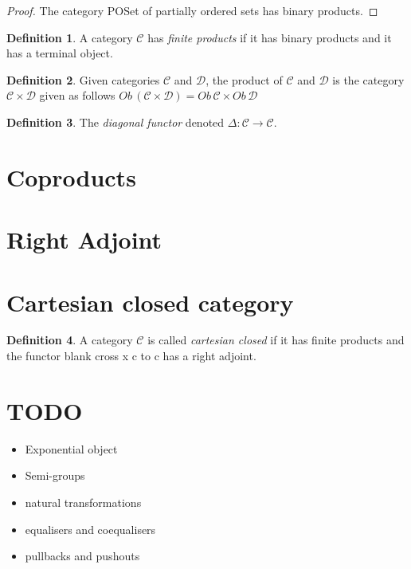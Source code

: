 \documentclass{article}
\theoremstyle{definition}
\newtheorem{definition}{Definition}[section]
\newcommand{\C}{\mathcal{C}}
\newcommand{\D}{\mathcal{D}}
\begin{document}
\begin{proof}
    The category POSet of partially ordered sets has binary products.
\end{proof}

\begin{definition}
    A category $\C$ has \textit{finite products} if
    it has binary products
    and it has a terminal object.
\end{definition}

\begin{definition}
    Given categories $\C$ and $\D$,
    the product of $\C$ and $\D$ is the category $\C \times \D$
    given as follows $Ob\,(\C \times \D) = Ob\,\C \times Ob\,\D$
\end{definition}

\begin{definition}
    The \textit{diagonal functor} denoted $\Delta : \C \rightarrow \C$.
\end{definition}


\section{Coproducts}

\section{Right Adjoint}

\section{Cartesian closed category}

\begin{definition}
    A category $\C$ is called \textit{cartesian closed}
    if it has finite products
    and the functor %
    blank cross x c to c has a right adjoint.
\end{definition}


\section{TODO}
\begin{itemize}
    \item Exponential object
    \item Semi-groups
    \item natural transformations
    \item equalisers and coequalisers
    \item pullbacks and pushouts
\end{itemize}
\end{document}
